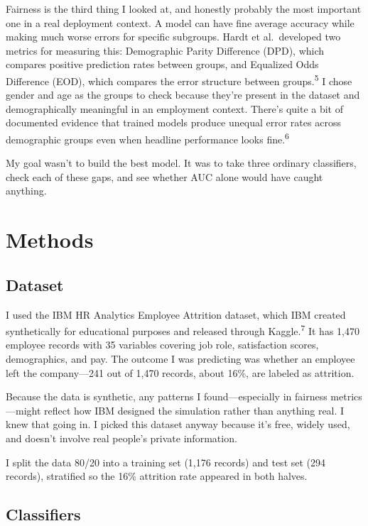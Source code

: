 \documentclass[12pt]{article}
\begin{document}
Fairness is the third thing I looked at, and honestly probably the most
important one in a real deployment context. A model can have fine average
accuracy while making much worse errors for specific subgroups. Hardt et al.\ developed
two metrics for measuring this: Demographic Parity Difference (DPD), which
compares positive prediction rates between groups, and Equalized Odds
Difference (EOD), which compares the error structure between
groups.\textsuperscript{5} I chose gender and age as the groups to check
because they're present in the dataset and demographically meaningful in
an employment context. There's quite a bit of documented evidence that
trained models produce unequal error rates across demographic groups even
when headline performance looks fine.\textsuperscript{6}

My goal wasn't to build the best model. It was to take three ordinary
classifiers, check each of these gaps, and see whether AUC alone would
have caught anything.

\section{Methods}

\subsection{Dataset}

I used the IBM HR Analytics Employee Attrition dataset, which IBM created
synthetically for educational purposes and released through
Kaggle.\textsuperscript{7} It has 1,470 employee records with 35 variables
covering job role, satisfaction scores, demographics, and pay. The outcome
I was predicting was whether an employee left the company---241 out of 1,470
records, about 16\%, are labeled as attrition.

Because the data is synthetic, any patterns I found---especially in fairness
metrics---might reflect how IBM designed the simulation rather than anything
real. I knew that going in. I picked this dataset anyway because it's free,
widely used, and doesn't involve real people's private information.

I split the data 80/20 into a training set (1,176 records) and test set (294
records), stratified so the 16\% attrition rate appeared in both halves.

\subsection{Classifiers}
\end{document}
